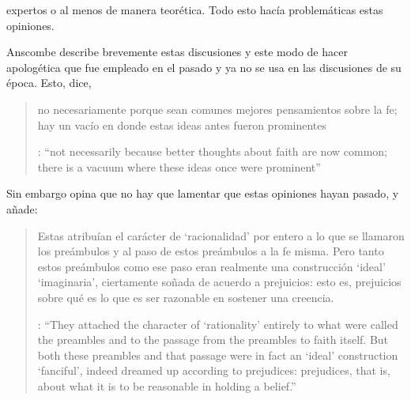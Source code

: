 expertos o al menos de manera teorética. Todo esto hacía problemáticas estas opiniones.

Anscombe describe brevemente estas discusiones y este modo de hacer apologética que fue empleado en el pasado y ya no se usa en las discusiones de su época. Esto, dice, \blockquote[{\cite[114]{anscombe1981erp:faith}}: \enquote{not necessarily because better thoughts about faith are now common; there is a vacuum where these ideas once were prominent}]{no necesariamente porque sean comunes mejores pensamientos sobre la fe; hay un vacío en donde estas ideas antes fueron prominentes}. Sin embargo opina que no hay que lamentar que estas opiniones hayan pasado, y añade: \blockquote[{\cite[114]{anscombe1981erp:faith}}: \enquote{They attached the character of `rationality' entirely to what were called the preambles and to the passage from the preambles to faith itself. But both these preambles and that passage were in fact an `ideal' construction \textelp{} `fanciful', indeed dreamed up according to prejudices: prejudices, that is, about what it is to be reasonable in holding a belief.}]{Estas atribuían el carácter de `racionalidad' por entero a lo que se llamaron los preámbulos y al paso de estos preámbulos a la fe misma. Pero tanto estos preámbulos como ese paso eran realmente una construcción `ideal' \textelp{} `imaginaria', ciertamente soñada de acuerdo a prejuicios: esto es, prejuicios sobre qué es lo que es ser razonable en sostener una creencia.}

